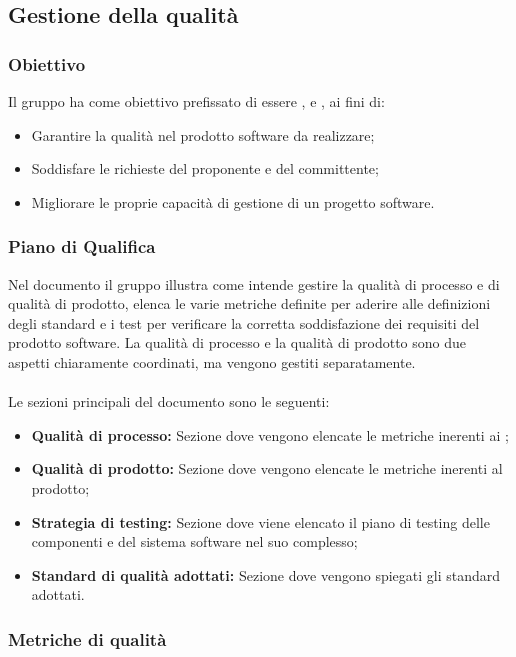 \subsection{Gestione della qualità}
\subsubsection{Obiettivo}
Il gruppo \Gruppo{} ha come obiettivo prefissato di essere ,  e , ai fini di:
\begin{itemize}
    \item Garantire la qualità nel prodotto software da realizzare;
    \item Soddisfare le richieste del proponente e del committente;
    \item Migliorare le proprie capacità di gestione di un progetto software.
\end{itemize}

\subsubsection{Piano di Qualifica}
Nel documento \PdQ{} il gruppo \Gruppo{} illustra come intende gestire la qualità di processo e di qualità di prodotto, elenca le varie metriche definite per aderire alle definizioni degli standard e i test per verificare la corretta soddisfazione dei requisiti del prodotto software.
La qualità di processo e la qualità di prodotto sono due aspetti chiaramente coordinati, ma vengono gestiti separatamente. \\ \\
Le sezioni principali del documento sono le seguenti:
\begin{itemize}
    \item \textbf{Qualità di processo:} Sezione dove vengono elencate le metriche inerenti ai ;
    \item \textbf{Qualità di prodotto:} Sezione dove vengono elencate le metriche inerenti al prodotto;
    \item \textbf{Strategia di testing:} Sezione dove viene elencato il piano di testing delle componenti e del sistema software nel suo complesso;
    \item \textbf{Standard di qualità adottati:} Sezione dove vengono spiegati gli standard adottati.
\end{itemize}

\subsubsection{Metriche di qualità}\mbox{}\\ \\
